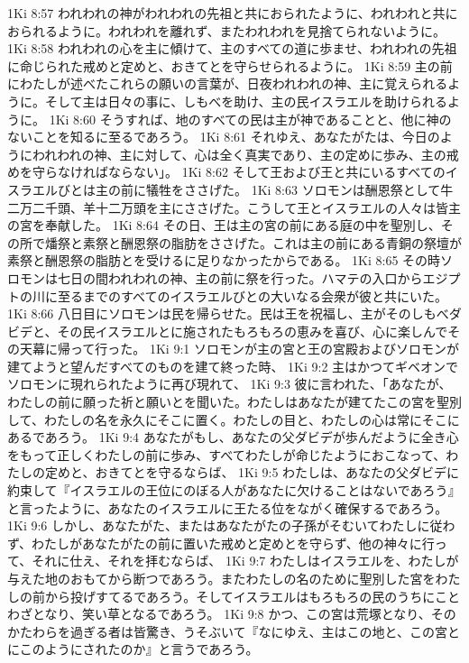 1Ki 8:57  われわれの神がわれわれの先祖と共におられたように、われわれと共におられるように。われわれを離れず、またわれわれを見捨てられないように。
1Ki 8:58  われわれの心を主に傾けて、主のすべての道に歩ませ、われわれの先祖に命じられた戒めと定めと、おきてとを守らせられるように。
1Ki 8:59  主の前にわたしが述べたこれらの願いの言葉が、日夜われわれの神、主に覚えられるように。そして主は日々の事に、しもべを助け、主の民イスラエルを助けられるように。
1Ki 8:60  そうすれば、地のすべての民は主が神であることと、他に神のないことを知るに至るであろう。
1Ki 8:61  それゆえ、あなたがたは、今日のようにわれわれの神、主に対して、心は全く真実であり、主の定めに歩み、主の戒めを守らなければならない」。
1Ki 8:62  そして王および王と共にいるすべてのイスラエルびとは主の前に犠牲をささげた。
1Ki 8:63  ソロモンは酬恩祭として牛二万二千頭、羊十二万頭を主にささげた。こうして王とイスラエルの人々は皆主の宮を奉献した。
1Ki 8:64  その日、王は主の宮の前にある庭の中を聖別し、その所で燔祭と素祭と酬恩祭の脂肪をささげた。これは主の前にある青銅の祭壇が素祭と酬恩祭の脂肪とを受けるに足りなかったからである。
1Ki 8:65  その時ソロモンは七日の間われわれの神、主の前に祭を行った。ハマテの入口からエジプトの川に至るまでのすべてのイスラエルびとの大いなる会衆が彼と共にいた。
1Ki 8:66  八日目にソロモンは民を帰らせた。民は王を祝福し、主がそのしもべダビデと、その民イスラエルとに施されたもろもろの恵みを喜び、心に楽しんでその天幕に帰って行った。
1Ki 9:1  ソロモンが主の宮と王の宮殿およびソロモンが建てようと望んだすべてのものを建て終った時、
1Ki 9:2  主はかつてギベオンでソロモンに現れられたように再び現れて、
1Ki 9:3  彼に言われた、「あなたが、わたしの前に願った祈と願いとを聞いた。わたしはあなたが建てたこの宮を聖別して、わたしの名を永久にそこに置く。わたしの目と、わたしの心は常にそこにあるであろう。
1Ki 9:4  あなたがもし、あなたの父ダビデが歩んだように全き心をもって正しくわたしの前に歩み、すべてわたしが命じたようにおこなって、わたしの定めと、おきてとを守るならば、
1Ki 9:5  わたしは、あなたの父ダビデに約束して『イスラエルの王位にのぼる人があなたに欠けることはないであろう』と言ったように、あなたのイスラエルに王たる位をながく確保するであろう。
1Ki 9:6  しかし、あなたがた、またはあなたがたの子孫がそむいてわたしに従わず、わたしがあなたがたの前に置いた戒めと定めとを守らず、他の神々に行って、それに仕え、それを拝むならば、
1Ki 9:7  わたしはイスラエルを、わたしが与えた地のおもてから断つであろう。またわたしの名のために聖別した宮をわたしの前から投げすてるであろう。そしてイスラエルはもろもろの民のうちにことわざとなり、笑い草となるであろう。
1Ki 9:8  かつ、この宮は荒塚となり、そのかたわらを過ぎる者は皆驚き、うそぶいて『なにゆえ、主はこの地と、この宮とにこのようにされたのか』と言うであろう。
